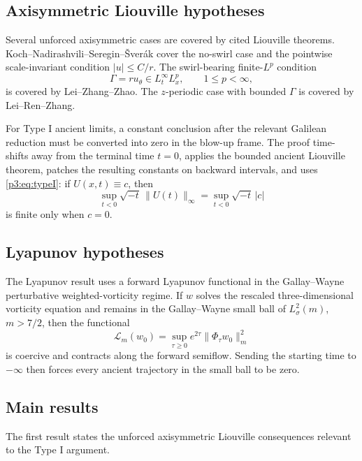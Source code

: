 \documentclass[11pt]{amsart}
\theoremstyle{plain}
\theoremstyle{definition}
\theoremstyle{remark}
\numberwithin{equation}{section}
\begin{document}
\subsection{Axisymmetric Liouville hypotheses}

Several unforced axisymmetric cases are covered by cited Liouville theorems.
Koch--Nadirashvili--Seregin--\v{S}ver\'ak cover the no-swirl case
and the pointwise scale-invariant condition \(|u|\le C/r\).  The
swirl-bearing finite-\(L^p\) condition
\[
   \Gamma=ru_\theta\in L_t^\infty L_x^p,\qquad 1\le p<\infty,
\]
is covered by Lei--Zhang--Zhao.  The \(z\)-periodic case with bounded
\(\Gamma\) is covered by Lei--Ren--Zhang.

For Type I ancient limits, a constant conclusion after the relevant Galilean
reduction must be converted into zero in the blow-up frame.  The proof
time-shifts away from the terminal time \(t=0\), applies the bounded ancient
Liouville theorem, patches the resulting constants on backward intervals, and
uses
\eqref{p3:eq:typeI}: if \(U(x,t)\equiv c\), then
\[
   \sup_{t<0}\sqrt{-t}\,\|U(t)\|_\infty
   =
   \sup_{t<0}\sqrt{-t}\,|c|
\]
is finite only when \(c=0\).

\subsection{Lyapunov hypotheses}

The Lyapunov result uses a forward Lyapunov functional in the
Gallay--Wayne perturbative weighted-vorticity regime.  If \(w\)
solves the rescaled three-dimensional vorticity equation and remains in the
Gallay--Wayne small ball of \(L^2_\sigma(m)\), \(m>7/2\), then the functional
\begin{equation}\label{p3:eq:intro-weighted-lyap}
   \mathcal L_m(w_0)
   =
   \sup_{\tau\ge0}e^{2\tau}\|\Phi_\tau w_0\|_m^2
\end{equation}
is coercive and contracts along the forward semiflow.  Sending the starting
time to \(-\infty\) then forces every ancient trajectory in the small ball to
be zero.

\subsection{Main results}

The first result states the unforced axisymmetric Liouville consequences
relevant to the Type I argument.
\end{document}
